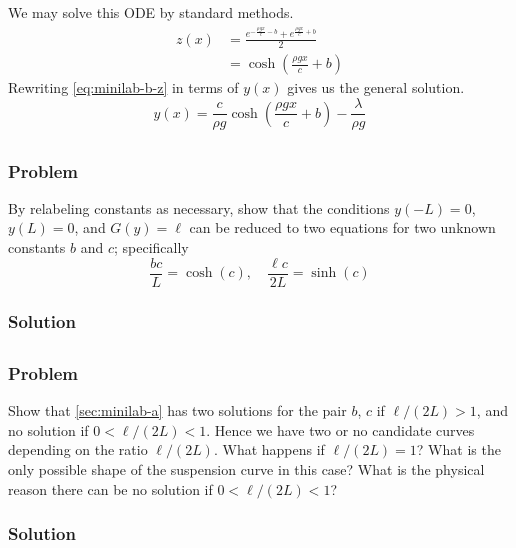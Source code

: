 \documentclass[12pt,twoside]{article}
\begin{document}
We may solve this ODE by standard methods.
\begin{equation}
  \label{eq:minilab-b-z}
  \begin{aligned}
    z(x) &= \frac{e^{-\frac{\rho g x}{c}-b} + e^{\frac{\rho g x}{c}+b}}{2} \\
    &= \cosh\left(\frac{\rho g x}{c} + b\right)
  \end{aligned}
\end{equation}
Rewriting \cref{eq:minilab-b-z} in terms of $y(x)$ gives us the general
solution.
\begin{equation*}
  \boxed{y(x) = \frac{c}{\rho g}\cosh\left(\frac{\rho g x}{c}+b\right) - \frac{\lambda}{\rho g}}
\end{equation*}

\subsection{}
\subsubsection*{Problem}
By relabeling constants as necessary, show that the conditions $y(-L)=0$,
$y(L)=0$, and $G(y)=\ell$ can be reduced to two equations for two unknown
constants $b$ and $c$; specifically
\begin{equation}
  \label{eq:minilab-b-problem}
  \frac{bc}{L}=\cosh(c),\quad \frac{\ell c}{2L}=\sinh(c)
\end{equation}

\subsubsection*{Solution}
\todo{}

\subsection{}
\subsubsection*{Problem}
Show that \cref{sec:minilab-a} has two solutions for the pair $b$, $c$ if
$\ell/(2L)>1$, and no solution if $0<\ell/(2L)<1$. Hence we have two or no
candidate curves depending on the ratio $\ell/(2L)$. What happens if
$\ell/(2L)=1$? What is the only possible shape of the suspension curve in this
case? What is the physical reason there can be no solution if $0<\ell/(2L)<1$?

\subsubsection*{Solution}
\todo{}
\end{document}
